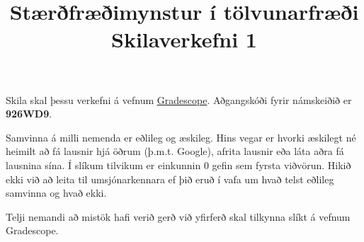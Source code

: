 \documentclass{exam}
\title{Stærðfræðimynstur í tölvunarfræði \\ Skilaverkefni 1}
\author{}
\begin{document}
\maketitle
\thispagestyle{empty} 

Skila skal þessu verkefni á vefnum \href{https://gradescope.com/}{Gradescope}. Aðgangskóði fyrir námskeiðið er \textbf{926WD9}.

Samvinna á milli nemenda er eðlileg og æskileg. Hins vegar er hvorki æskilegt né heimilt að fá lausnir hjá öðrum (þ.m.t. Google), afrita lausnir eða láta aðra fá lausnina sína. Í slíkum tilvikum er einkunnin 0 gefin sem fyrsta viðvörun. Hikið ekki við að leita til umsjónarkennara ef þið eruð í vafa um hvað telst eðlileg samvinna og hvað ekki.

Telji nemandi að mistök hafi verið gerð við yfirferð skal tilkynna slíkt á vefnum Gradescope.
\end{document}
